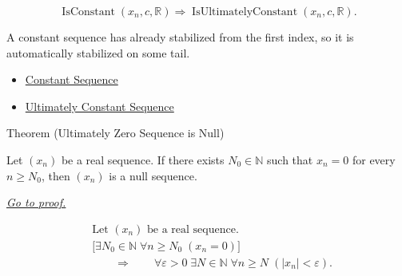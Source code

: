 \begin{remark*}
\[
\operatorname{IsConstant}(x_n,c,\mathbb{R})
\Longrightarrow
\operatorname{IsUltimatelyConstant}(x_n,c,\mathbb{R}).
\]
\end{remark*}

\begin{remark*}[Interpretation]
A constant sequence has already stabilized from the first index, so it is
automatically stabilized on some tail.
\end{remark*}

\begin{dependencies}
\begin{itemize}
  \item \hyperref[def:constant-sequence]{Constant Sequence}
  \item \hyperref[def:ultimately-constant-sequence]{Ultimately Constant Sequence}
\end{itemize}
\end{dependencies}


\begin{theorembox}{Theorem (Ultimately Zero Sequence is Null)}
\begin{theorem}
\label{thm:ultimately-zero-sequence-is-null}
Let $(x_n)$ be a real sequence. If there exists $N_0 \in \mathbb{N}$ such
that $x_n = 0$ for every $n \ge N_0$, then $(x_n)$ is a null sequence.

\smallskip
\noindent
\hyperref[prf:ultimately-zero-sequence-is-null]{\textit{Go to proof.}}
\end{theorem}
\end{theorembox}

\begin{remark*}
\[
\begin{aligned}
&\text{Let } (x_n) \text{ be a real sequence.}\\
&\bigl[
\exists N_0 \in \mathbb{N}\;
\forall n \ge N_0\;(x_n = 0)
\bigr]\\
&\qquad\Longrightarrow\qquad
\forall \varepsilon > 0\;
\exists N \in \mathbb{N}\;
\forall n \ge N\;(|x_n| < \varepsilon).
\end{aligned}
\]
\end{remark*}

